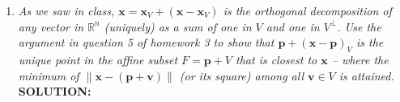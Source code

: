 \documentclass[12pt]{article}
\begin{document}
\begin{enumerate}
\begin{enumerate}
                    Since \(\alpha \in \mathbb{R}\), it can be factored out like so:
                    \begin{align*}
                        (\alpha\mathbf{x})_V & = \sum_{i=1}^{k} ((\alpha\mathbf{x}) \cdot{} \mathbf{u}_i)\mathbf{u}_i \\
                                             & = \sum_{i=1}^{k} (\alpha(\mathbf{x} \cdot{} \mathbf{u}_i))\mathbf{u}_i \\
                                             & = \alpha\sum_{i=1}^{k} (\mathbf{x} \cdot{} \mathbf{u}_i)\mathbf{u}_i   \\
                                             & = \alpha(\mathbf{x}_V)                                                 \\
                    \end{align*}
              \item{} If \(\mathbf{x}\in{V}\text{, then }\mathbf{x}_V = \mathbf{x}\): \\

                    If $\mathbf{x}$ is an element of subspace V, then it can also be written as a linear combination of any orthonormal basis in V
                    \begin{align*}
                        \mathbf{x}_V & = \sum_{i=1}^{k} (\mathbf{x} \cdot{} \mathbf{u}_i)\mathbf{u}_i \\
                                     & = \mathbf{x}
                    \end{align*}

          \end{enumerate}
    \item{} \emph{As we saw in class, $\mathbf{x} = \mathbf{x}_V + (\mathbf{x} - \mathbf{x}_V)$ is the orthogonal decomposition of any vector in $\mathbb{R}^n$ (uniquely) as a sum of one in $V$ and one in $V^\perp$. Use the argument in question 5 of homework 3 to show that $\mathbf{p} + (\mathbf{x} - \mathbf{p})_V$ is the unique point in the affine subset $F = \mathbf{p} + V$ that is closest to $\mathbf{x}$ -- where the minimum of $\|\mathbf{x} - (\mathbf{p} + \mathbf{v})\|$ (or its square) among all $\mathbf{v} \in V$ is attained.} \\

          \textbf{SOLUTION:}


\end{enumerate}
\end{document}

